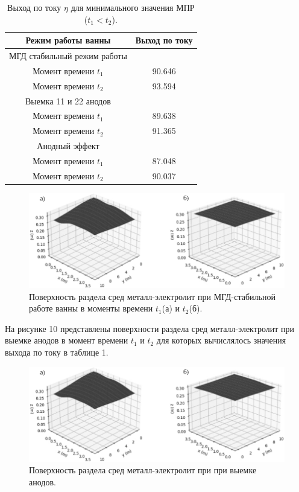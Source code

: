 \documentclass[pdflatex,sn-mathphys-gost]{pmi-jnl}
\begin{document}
\begin{table}[h]
\caption{Выход по току $\eta$ для минимального значения МПР ($t_1 < t_2$).} \label{table:vihPoToku}
\centering
\begin{tabular}{|c|c|}
\hline
Режим работы ванны &Выход по току	\\
\hline
МГД стабильный режим работы &	\\
Момент времени $t_1$			&90.646	\\
Момент времени $t_2$		&93.594	\\
\hline
Выемка 11 и 22 анодов &	\\
Момент времени $t_1$		&89.638	\\
Момент времени $t_2$		&91.365	\\
\hline
Анодный эффект &	\\
Момент времени $t_1$	&87.048	\\
Момент времени $t_2$	&90.037	\\
\hline
\end{tabular}
\end{table}

\begin{figure}[ht]
    \centering
    \includegraphics[width=\textwidth]{спокойная поверхность.png}
    \caption{Поверхность раздела сред металл-электролит при МГД-стабильной работе ванны в моменты времени $t_1$(а) и $t_2$(б).}
    \label{fig:stab}
\end{figure}

На рисунке 10 представлены поверхности раздела сред металл-электролит при выемке анодов в момент времени $t_1$ и $t_2$ для которых вычислялось значения выхода по току в таблице 1.

\begin{figure}[ht]
    \centering
    \includegraphics[width=\textwidth]{Выемка анодов поверхность.png}
    \caption{Поверхность раздела сред металл-электролит при при выемке анодов.}
    \label{fig:viemkaanod}
\end{figure}
\end{document}
